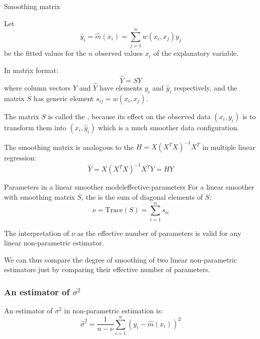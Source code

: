\begin{definition}{Smoothing matrix}{}

	Let
	\begin{equation*}
		\hat y_i = \hat m (x_i) = \sum_{j=1}^n w(x_i, x_j) y_j
	\end{equation*}
	be the fitted values for the $n$ observed values  $x_i$ of the explanatory variable.

	In matrix format:
	\begin{equation*}
		\hat Y = S Y
	\end{equation*}
	where column vectors $Y$ and $\hat Y$ have elements $y_i$ and $\hat y_i$ respectively,
	and the matrix $S$ has generic element $s_{ij} = w(x_i, x_j)$.

	\begin{note}
		The matrix $S$ is called the , because its effect on the observed
		data $(x_i, y_i)$ is to transform them into $(x_i, \hat y_i)$ which is a much
		smoother data configuration.
	\end{note}

	\tcblower
	The smoothing matrix is analogous to the  $H = X(X^TX)^{-1}X^T$ in
	multiple linear regression:
	\begin{equation*}
		\hat Y = X(X^TX)^{-1}X^T Y = H Y
	\end{equation*}
\end{definition}

\begin{prop}{Parameters in a linear smoother model}{effective-parameters}
	For a linear smoother with smoothing matrix $S$, the  is the sum of diagonal elements of $S$:
	\begin{equation*}
		\nu = \text{Trace}(S) = \sum_{i=1}^n s_{ii}
	\end{equation*}
	\tcblower
	\begin{note}
		The interpretation of $\nu$ as the effective number of parameters is
		valid for any linear non-parametric estimator.
	\end{note}

	We can thus compare the degree of smoothing of two linear non-parametric
	estimators just by comparing their effective number of parameters.
\end{prop}

\subsubsection{An estimator of $\sigma^2$}
An estimator of $\sigma^2$ in non-parametric estimation is:
\begin{equation*}
	\hat\sigma^2 = \frac{1}{n-\nu} \sum_{i=1}^n (y_i - \hat m(x_i))^2
\end{equation*}

